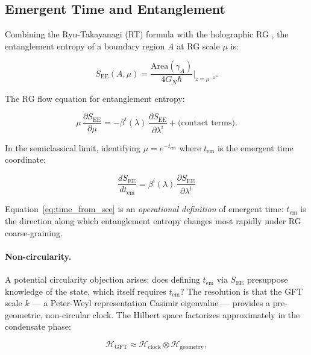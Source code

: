 \documentclass[12pt,a4paper]{article}
\newcommand{\GFT}{\mathrm{GFT}}
\newcommand{\EE}{\mathrm{EE}}
\begin{document}
\subsection{Emergent Time and Entanglement}
\label{sec:entanglement}

Combining the Ryu-Takayanagi (RT) formula with the holographic RG
\cite{maldacena1997,witten1998}, the entanglement entropy of a boundary
region $A$ at RG scale $\mu$ is:

\begin{equation}
\label{eq:rt}
S_\EE(A,\mu) = \frac{\mathrm{Area}(\gamma_A)}{4G_N\hbar}
\bigg|_{z=\mu^{-1}}.
\end{equation}

The RG flow equation for entanglement entropy:

\begin{equation}
\label{eq:see_flow}
\mu\,\frac{\partial S_\EE}{\partial\mu}
= -\beta^i(\lambda)\,\frac{\partial S_\EE}{\partial\lambda^i}
+ \text{(contact terms)}.
\end{equation}

In the semiclassical limit, identifying $\mu = e^{-t_{\mathrm{em}}}$
where $t_{\mathrm{em}}$ is the emergent time coordinate:

\begin{equation}
\label{eq:time_from_see}
\boxed{
\frac{dS_\EE}{dt_{\mathrm{em}}}
= \beta^i(\lambda)\,\frac{\partial S_\EE}{\partial\lambda^i}
}
\end{equation}

Equation~\eqref{eq:time_from_see} is an \emph{operational definition}
of emergent time: $t_{\mathrm{em}}$ is the direction along which
entanglement entropy changes most rapidly under RG coarse-graining.

\paragraph{Non-circularity.}
A potential circularity objection arises: does defining $t_{\mathrm{em}}$
via $S_\EE$ presuppose knowledge of the state, which itself requires
$t_{\mathrm{em}}$?
The resolution is that the GFT scale $k$ — a Peter-Weyl representation
Casimir eigenvalue — provides a pre-geometric, non-circular clock.
The Hilbert space factorizes approximately in the condensate phase:

\begin{equation}
\label{eq:factorization}
\mathcal{H}_\GFT \approx \mathcal{H}_{\mathrm{clock}} \otimes
\mathcal{H}_{\mathrm{geometry}},
\end{equation}
\end{document}
